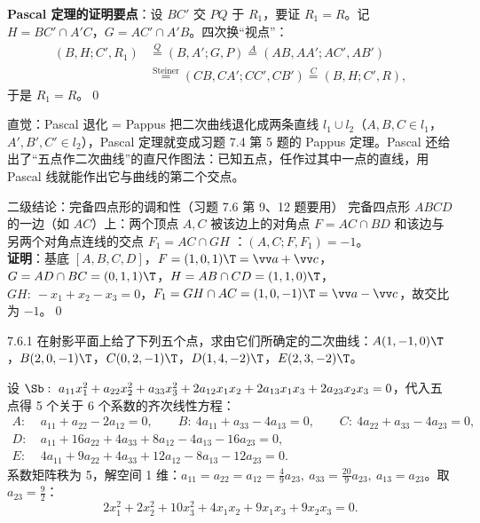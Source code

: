 \noindent\textbf{Pascal 定理的证明要点}：设 $BC'$ 交 $PQ$ 于 $R_1$，要证 $R_1=R$。记 $H=BC'\cap A'C$，$G=AC'\cap A'B$。四次换“视点”：
\begin{align*}
(B,H;C',R_1)&\overset{Q}{=}(B,A';G,P)\overset{A}{=}(AB,AA';AC',AB')\\
&\overset{\text{Steiner}}{=}(CB,CA';CC',CB')\overset{C}{=}(B,H;C',R),
\end{align*}
于是 $R_1=R$。\qed

\begin{intbox}{直觉：Pascal 退化 = Pappus}
把二次曲线退化成两条直线 $l_1\cup l_2$（$A,B,C\in l_1$，$A',B',C'\in l_2$），Pascal 定理就变成习题 7.4 第 5 题的 Pappus 定理。Pascal 还给出了“五点作二次曲线”的直尺作图法：已知五点，任作过其中一点的直线，用 Pascal 线就能作出它与曲线的第二个交点。
\end{intbox}

\begin{thmbox}{二级结论：完备四点形的调和性（习题 7.6 第 9、12 题要用）}
完备四点形 $ABCD$ 的一边（如 $AC$）上：两个顶点 $A,C$ 被该边上的对角点 $F=AC\cap BD$ 和该边与另两个对角点连线的交点 $F_1=AC\cap GH$ ：$(A,C;F,F_1)=-1$。\\[2pt]
\textbf{证明}：基底 $[A,B,C,D]$，$F=(1,0,1)\T=\vv a+\vv c$，$G=AD\cap BC=(0,1,1)\T$，$H=AB\cap CD=(1,1,0)\T$，$GH:\ -x_1+x_2-x_3=0$，$F_1=GH\cap AC=(1,0,-1)\T=\vv a-\vv c$，故交比为 $-1$。\qed
\end{thmbox}


\begin{ex}{7.6.1}
在射影平面上给了下列五个点，求由它们所确定的二次曲线：$A(1,-1,0)\T$，$B(2,0,-1)\T$，$C(0,2,-1)\T$，$D(1,4,-2)\T$，$E(2,3,-2)\T$。
\end{ex}
\jie 设 $\Sb:\ a_{11}x_1^2+a_{22}x_2^2+a_{33}x_3^2+2a_{12}x_1x_2+2a_{13}x_1x_3+2a_{23}x_2x_3=0$，代入五点得 5 个关于 6 个系数的齐次线性方程：
\begin{align*}
A:&\ a_{11}+a_{22}-2a_{12}=0, \qquad B:\ 4a_{11}+a_{33}-4a_{13}=0, \qquad C:\ 4a_{22}+a_{33}-4a_{23}=0,\\
D:&\ a_{11}+16a_{22}+4a_{33}+8a_{12}-4a_{13}-16a_{23}=0,\\
E:&\ 4a_{11}+9a_{22}+4a_{33}+12a_{12}-8a_{13}-12a_{23}=0 .
\end{align*}
系数矩阵秩为 5，解空间 1 维：$a_{11}=a_{22}=a_{12}=\frac49a_{23},\ a_{33}=\frac{20}9a_{23},\ a_{13}=a_{23}$。取 $a_{23}=\frac92$：
\[
2x_1^2+2x_2^2+10x_3^2+4x_1x_2+9x_1x_3+9x_2x_3=0 .
\]

